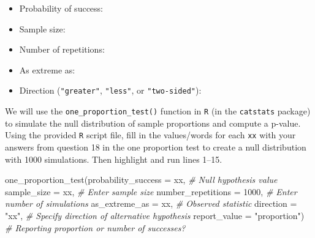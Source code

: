 \documentclass[
]{report}
\newenvironment{Shaded}{\begin{snugshade}}{\end{snugshade}}
\newcommand{\AttributeTok}[1]{\textcolor[rgb]{0.77,0.63,0.00}{#1}}
\newcommand{\CommentTok}[1]{\textcolor[rgb]{0.56,0.35,0.01}{\textit{#1}}}
\newcommand{\DecValTok}[1]{\textcolor[rgb]{0.00,0.00,0.81}{#1}}
\newcommand{\FunctionTok}[1]{\textcolor[rgb]{0.00,0.00,0.00}{#1}}
\newcommand{\NormalTok}[1]{#1}
\newcommand{\StringTok}[1]{\textcolor[rgb]{0.31,0.60,0.02}{#1}}
\providecommand{\tightlist}{%
  \setlength{\itemsep}{0pt}\setlength{\parskip}{0pt}}
\begin{document}
\vspace{1mm}

\begin{itemize}
\tightlist
\item
  Probability of success:
\end{itemize}

\vspace{.2in}

\begin{itemize}
\tightlist
\item
  Sample size:
\end{itemize}

\vspace{.2in}

\begin{itemize}
\tightlist
\item
  Number of repetitions:
\end{itemize}

\vspace{.2in}

\begin{itemize}
\tightlist
\item
  As extreme as:
\end{itemize}

\vspace{.2in}

\begin{itemize}
\tightlist
\item
  Direction (\texttt{"greater"}, \texttt{"less"}, or \texttt{"two-sided"}):
\end{itemize}

\vspace{.2in}

We will use the \texttt{one\_proportion\_test()} function in \texttt{R} (in the \texttt{catstats} package) to simulate the null distribution of sample proportions and compute a p-value. Using the provided \texttt{R} script file, fill in the values/words for each \texttt{xx} with your answers from question 18 in the one proportion test to create a null distribution with 1000 simulations. Then highlight and run lines 1--15.

\begin{Shaded}
\begin{Highlighting}[]
\FunctionTok{one\_proportion\_test}\NormalTok{(}\AttributeTok{probability\_success =}\NormalTok{ xx, }\CommentTok{\# Null hypothesis value}
          \AttributeTok{sample\_size =}\NormalTok{ xx, }\CommentTok{\# Enter sample size}
          \AttributeTok{number\_repetitions =} \DecValTok{1000}\NormalTok{, }\CommentTok{\# Enter number of simulations}
          \AttributeTok{as\_extreme\_as =}\NormalTok{ xx, }\CommentTok{\# Observed statistic}
          \AttributeTok{direction =} \StringTok{"xx"}\NormalTok{, }\CommentTok{\# Specify direction of alternative hypothesis}
          \AttributeTok{report\_value =} \StringTok{"proportion"}\NormalTok{) }\CommentTok{\# Reporting proportion or number of successes?}
\end{Highlighting}
\end{Shaded}
\end{document}
